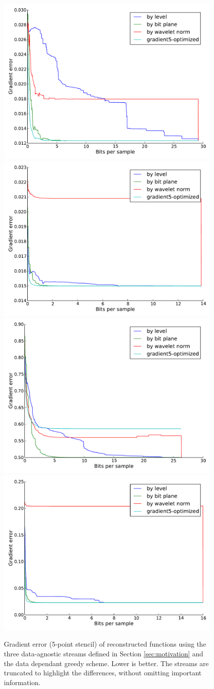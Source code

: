 \begin{figure}
  \centering
        {\includegraphics[width=0.48\linewidth]{img/motivation-3d/gradient5-boiler.pdf}}
 	{\includegraphics[width=0.48\linewidth]{img/motivation-3d/gradient5-diffusivity.pdf}}
 	{\includegraphics[width=0.48\linewidth]{img/motivation-3d/gradient5-turbulence.pdf}}
 	{\includegraphics[width=0.48\linewidth]{img/motivation-3d/gradient5-velocityz.pdf}}
 	\caption{Gradient error (5-point stencil) of reconstructed functions using the three data-agnostic streams
 	defined in Section \ref{sec:motivation} and the data dependant greedy scheme. Lower is better.
        The streams are truncated to highlight
 	the differences, without omitting important information.}
 	\label{fig:motivation-3d-gradient5}
\end{figure}

